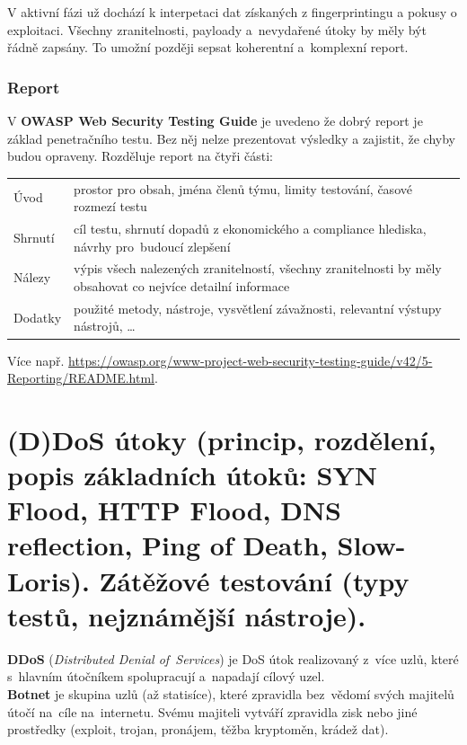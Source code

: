 V aktivní fázi už dochází k interpetaci dat získaných z fingerprintingu a pokusy o exploitaci. Všechny zranitelnosti, payloady a~nevydařené útoky by měly být řádně zapsány. To umožní později sepsat koherentní a~komplexní report. 

\subsubsection{Report}

V \textbf{OWASP Web Security Testing Guide} je uvedeno že dobrý report je základ penetračního testu. Bez něj nelze prezentovat výsledky a zajistit, že chyby budou opraveny. Rozděluje report na čtyři části:

\begin{table}[ht]
\centering
\begin{tabular}{p{1.5cm}|p{13.5cm}}
Úvod      &  prostor pro obsah, jména členů týmu, limity testování, časové rozmezí testu\\
Shrnutí   &  cíl testu, shrnutí dopadů z ekonomického a compliance hlediska, návrhy pro~budoucí zlepšení \\
Nálezy    &  výpis všech nalezených zranitelností, všechny zranitelnosti by měly obsahovat co nejvíce detailní informace \\
Dodatky   & použité metody, nástroje, vysvětlení závažnosti, relevantní výstupy nástrojů, \dots \\
\end{tabular}
\end{table}

Více např. \url{https://owasp.org/www-project-web-security-testing-guide/v42/5-Reporting/README.html}.


\clearpage
\section{(D)DoS útoky (princip, rozdělení, popis základních útoků: SYN Flood, HTTP Flood, DNS reflection, Ping of Death, Slow-Loris). Zátěžové testování (typy testů, nejznámější nástroje).}

\textbf{DDoS} (\emph{Distributed Denial of~Services}) je DoS útok realizovaný z~více uzlů, které s~hlavním útočníkem spolupracují a~napadají cílový uzel. \\
\textbf{Botnet} je skupina uzlů (až statisíce), které zpravidla bez~vědomí svých majitelů útočí na~cíle na~internetu. Svému majiteli vytváří zpravidla zisk nebo jiné prostředky (exploit, trojan, pronájem, těžba kryptoměn, krádež dat).

